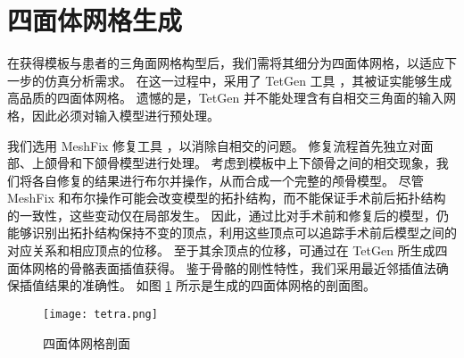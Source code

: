 \section{四面体网格生成}

在获得模板与患者的三角面网格构型后，我们需将其细分为四面体网格，以适应下一步的仿真分析需求。
在这一过程中，采用了 TetGen 工具 \cite{siTetGenDelaunaybasedQuality2015}，其被证实能够生成高品质的四面体网格。
遗憾的是，TetGen 并不能处理含有自相交三角面的输入网格，因此必须对输入模型进行预处理。

我们选用 MeshFix 修复工具 \cite{atteneLightweightApproachRepairing2010}，以消除自相交的问题。
修复流程首先独立对面部、上颌骨和下颌骨模型进行处理。
考虑到模板中上下颌骨之间的相交现象，我们将各自修复的结果进行布尔并操作，从而合成一个完整的颅骨模型。
尽管 MeshFix 和布尔操作可能会改变模型的拓扑结构，而不能保证手术前后拓扑结构的一致性，这些变动仅在局部发生。
因此，通过比对手术前和修复后的模型，仍能够识别出拓扑结构保持不变的顶点，利用这些顶点可以追踪手术前后模型之间的对应关系和相应顶点的位移。
至于其余顶点的位移，可通过在 TetGen 所生成四面体网格的骨骼表面插值获得。
鉴于骨骼的刚性特性，我们采用最近邻插值法确保插值结果的准确性。
如图 \ref{fig:tetra} 所示是生成的四面体网格的剖面图。

\begin{figure}
  \centering
  \texttt{[image: tetra.png]}
  \caption{四面体网格剖面}
  \label{fig:tetra}
\end{figure}
